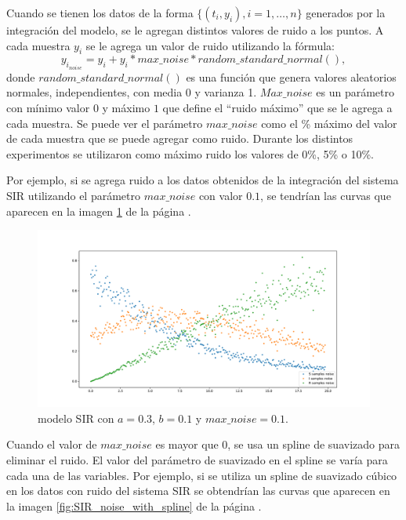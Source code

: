 Cuando se tienen los datos de la forma $\{(t_i, y_i), i=1, \dots, n\}$ generados por la integración del modelo, se le agregan distintos valores de ruido a los puntos. A cada muestra $y_i$ se le agrega un valor de ruido utilizando la fórmula:
$$y_{i_{noise}} = y_i + y_i * max\_noise * random\_standard\_normal(),$$
donde $random\_standard\_normal()$ es una función que genera valores aleatorios normales, independientes, con media 0 y varianza 1. $Max\_noise$ es un parámetro con mínimo valor $0$ y máximo $1$ que define el ``ruido  máximo'' que se le agrega a cada muestra. Se puede ver el parámetro $max\_noise$ como el \% máximo del valor de cada muestra que se puede agregar como ruido. Durante los distintos experimentos se utilizaron como máximo ruido los valores de 0\%, 5\% o 10\%.

Por ejemplo, si se agrega ruido a los datos obtenidos de la integración del sistema SIR utilizando el parámetro $max\_noise$ con valor $0.1$, se tendrían las curvas que aparecen en la imagen \ref{fig:SIR_with_noise} de la página \pageref{fig:SIR_with_noise}.

\begin{figure}[h]
    \centering
    \includegraphics[width=\textwidth]{"figures/SIR_with_noise.pdf"}
    \caption{modelo SIR con $a = 0.3$, $b = 0.1$ y $max\_noise = 0.1$.}
    \label{fig:SIR_with_noise}
\end{figure}

Cuando el valor de $max\_noise$ es mayor que 0, se usa un spline de suavizado para eliminar el ruido. El valor del parámetro de suavizado en el spline se varía para cada una de las variables. Por ejemplo, si se utiliza un spline de suavizado cúbico en los datos con ruido del sistema SIR se obtendrían las curvas que aparecen en la imagen \ref{fig:SIR_noise_with_spline} de la página \pageref{fig:SIR_noise_with_spline}.

